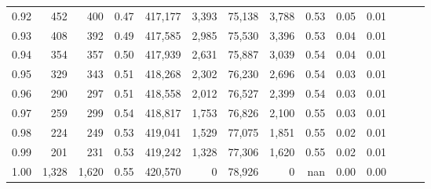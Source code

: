 \begin{tabular}{rrrrrrrrrrrrrr}
0.92 &    452 &    400 &  0.47 &  417,177 &    3,393 &  75,138 &   3,788 &  0.53 &  0.05 &      0.01 \\
0.93 &    408 &    392 &  0.49 &  417,585 &    2,985 &  75,530 &   3,396 &  0.53 &  0.04 &      0.01 \\
0.94 &    354 &    357 &  0.50 &  417,939 &    2,631 &  75,887 &   3,039 &  0.54 &  0.04 &      0.01 \\
0.95 &    329 &    343 &  0.51 &  418,268 &    2,302 &  76,230 &   2,696 &  0.54 &  0.03 &      0.01 \\
0.96 &    290 &    297 &  0.51 &  418,558 &    2,012 &  76,527 &   2,399 &  0.54 &  0.03 &      0.01 \\
0.97 &    259 &    299 &  0.54 &  418,817 &    1,753 &  76,826 &   2,100 &  0.55 &  0.03 &      0.01 \\
0.98 &    224 &    249 &  0.53 &  419,041 &    1,529 &  77,075 &   1,851 &  0.55 &  0.02 &      0.01 \\
0.99 &    201 &    231 &  0.53 &  419,242 &    1,328 &  77,306 &   1,620 &  0.55 &  0.02 &      0.01 \\
1.00 &  1,328 &  1,620 &  0.55 &  420,570 &        0 &  78,926 &       0 &   nan &  0.00 &      0.00 \\
\bottomrule
\end{tabular}
